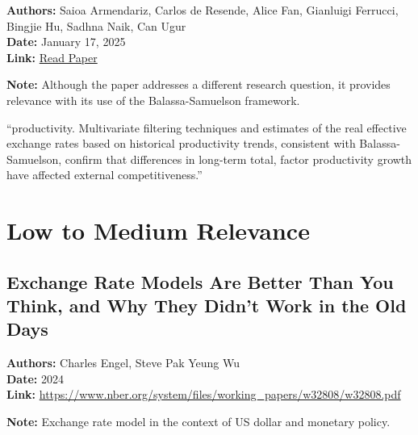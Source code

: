 \documentclass[
  11pt,
]{article}
\begin{document}
\textbf{Authors:} Saioa Armendariz, Carlos de Resende, Alice Fan,
Gianluigi Ferrucci, Bingjie Hu, Sadhna Naik, Can Ugur\\
\textbf{Date:} January 17, 2025\\
\textbf{Link:}
\href{https://drive.google.com/file/d/1GFUm5ckExKBUJ7CXxZ4ZyplTKT2Krc28/view?usp=sharing}{Read
Paper}

\textbf{Note:} Although the paper addresses a different research
question, it provides relevance with its use of the Balassa-Samuelson
framework.

\begin{tcolorbox}[enhanced jigsaw, bottomtitle=1mm, colback=white, coltitle=black, leftrule=.75mm, bottomrule=.15mm, arc=.35mm, toptitle=1mm, titlerule=0mm, colframe=quarto-callout-note-color-frame, breakable, title=\textcolor{quarto-callout-note-color}{\faInfo}\hspace{0.5em}{Relevant Quote}, opacitybacktitle=0.6, left=2mm, rightrule=.15mm, opacityback=0, toprule=.15mm, colbacktitle=quarto-callout-note-color!10!white]

``productivity. Multivariate filtering techniques and estimates of the
real effective exchange rates based on historical productivity trends,
consistent with Balassa-Samuelson, confirm that differences in long-term
total, factor productivity growth have affected external
competitiveness.''

\end{tcolorbox}

\section{Low to Medium Relevance}\label{low-to-medium-relevance}

\subsection{Exchange Rate Models Are Better Than You Think, and Why They
Didn't Work in the Old
Days}\label{exchange-rate-models-are-better-than-you-think-and-why-they-didnt-work-in-the-old-days}

\textbf{Authors:} Charles Engel, Steve Pak Yeung Wu\\
\textbf{Date:} 2024\\
\textbf{Link:}
\url{https://www.nber.org/system/files/working_papers/w32808/w32808.pdf}

\textbf{Note:} Exchange rate model in the context of US dollar and
monetary policy.
\end{document}
